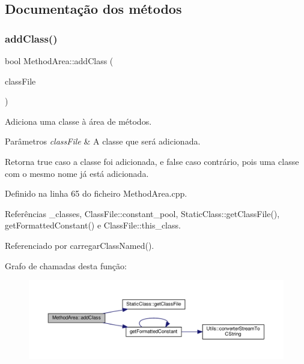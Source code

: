 \subsection{Documentação dos métodos}
\mbox{\label{classMethodArea_a9e4e378de46c1a9836820d86cd9dadb8}} 
\subsubsection{\texorpdfstring{add\+Class()}{addClass()}}
{\footnotesize\ttfamily bool Method\+Area\+::add\+Class (\begin{DoxyParamCaption}\item[{\hyperlink{classStaticClass}{Static\+Class} $\ast$}]{class\+File }\end{DoxyParamCaption})\hspace{0.3cm}{\ttfamily [private]}}



Adiciona uma classe à área de métodos. 


\begin{DoxyParams}{Parâmetros}
{\em class\+File} & A classe que será adicionada. \\
\hline
\end{DoxyParams}
\begin{DoxyReturn}{Retorna}
{\ttfamily true} caso a classe foi adicionada, e {\ttfamily false} caso contrário, pois uma classe com o mesmo nome já está adicionada. 
\end{DoxyReturn}


Definido na linha 65 do ficheiro Method\+Area.\+cpp.



Referências \+\_\+classes, Class\+File\+::constant\+\_\+pool, Static\+Class\+::get\+Class\+File(), get\+Formatted\+Constant() e Class\+File\+::this\+\_\+class.



Referenciado por carregar\+Class\+Named().

Grafo de chamadas desta função\+:
\nopagebreak
\begin{figure}[H]
\begin{center}
\leavevmode
\includegraphics[width=350pt]{classMethodArea_a9e4e378de46c1a9836820d86cd9dadb8_cgraph}
\end{center}
\end{figure}
\mbox{\label{classMethodArea_a6e5cd27f3133d70a8c56c5daf9190ba6}} 
